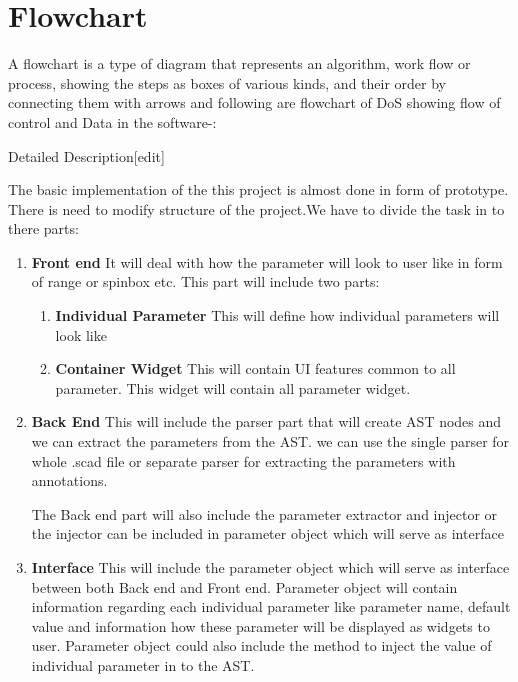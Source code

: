 \section{Flowchart}
A flowchart is a type of diagram that represents an algorithm, work flow or process, showing the steps as boxes of various kinds, and their order by connecting them with arrows
and following are flowchart of DoS showing flow of control and Data in the software-:

Detailed Description[edit]

The basic implementation of the this project is almost done in form of prototype. There is need to modify structure of the project.We have to divide the task in to there parts:

\begin{enumerate}
	\item \textbf{Front end}
	It will deal with how the parameter will look to user like in form of range or spinbox etc. This part will include two parts:
	\begin{enumerate}
		\item \textbf{Individual Parameter}
		This will define how individual parameters will look like
		\item \textbf{Container Widget}
		This will contain UI features common to all parameter. This widget will contain all parameter widget. 
		
	\end{enumerate}
	
	\item \textbf{Back End}
	This will include the parser part that will create AST nodes and we can extract the parameters from the AST. we can use the single parser for whole .scad file or separate parser for extracting the parameters with annotations.
	
	The Back end part will also include the parameter extractor and injector or the injector can be included in parameter object which will serve as interface 
	\item \textbf{Interface}
	This will include the parameter object which will serve as interface between both Back end and Front end. Parameter object will contain information regarding each individual parameter like parameter name, default value and information how these parameter will be displayed as widgets to user. Parameter object could also include the method to inject the value of individual parameter in to the AST. 
	
\end{enumerate}

